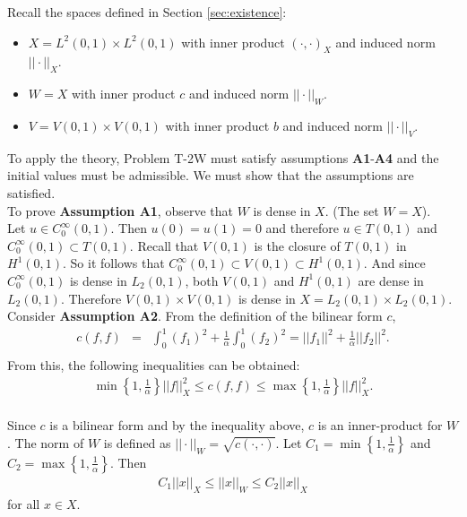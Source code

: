 \documentclass[../../main.tex]{subfiles}
\begin{document}
Recall the spaces defined in Section \ref{sec:existence}:
\begin{itemize}
	\item[] $X = L^2(0,1)\times L^2(0,1)$ with inner product $(\cdot,\cdot)_X$ and induced norm $||\cdot||_X$.
	\item[] $W = X$ with inner product $c$ and induced norm $||\cdot||_W$.
	\item[] $V  = V(0,1)\times V(0,1)$ with inner product $b$ and induced norm $||\cdot||_V$.
\end{itemize}

To apply the theory, Problem T-2W must satisfy assumptions \textbf{A1}-\textbf{A4} and the initial values must be admissible. We must show that the assumptions are satisfied.\\

To prove \textbf{Assumption A1}, observe that $W$ is dense in $X$. (The set $W = X$).\\

Let $u \in C_0^\infty(0,1)$. Then $u(0) = u(1) = 0$ and therefore $u \in T(0,1)$ and $C_0^\infty(0,1) \subset T(0,1)$. Recall that $V(0,1)$ is the closure of $T(0,1)$ in $H^1(0,1)$. So it follows that $C_0^\infty(0,1) \subset V(0,1) \subset H^1(0,1)$. And since $C_0^\infty(0,1)$ is dense in $L_2(0,1)$, both $V(0,1)$ and $H^1(0,1)$ are dense in $L_2(0,1)$. Therefore $V(0,1)\times V(0,1)$ is dense in $X = L_2(0,1) \times L_2(0,1)$.\label{sym:Cinftyzero} \\

Consider \textbf{Assumption A2}. From the definition of the bilinear form $c$,
\begin{eqnarray*}
	c(f,f) & = & \int_0^1  (f_1)^2 + \frac{1}{\alpha}\int_0^1  (f_2)^2 = ||f_1||^2 + \frac{1}{\alpha}||f_2||^2.\\
\end{eqnarray*}
From this, the following inequalities can be obtained:
\begin{eqnarray*}
	\min\left\{1, \frac{1}{\alpha}\right\} ||f||_{X}^2 \leq	c(f,f)	\leq \max\left\{1, \frac{1}{\alpha}\right\} ||f||_{X}^2.\\
\end{eqnarray*}

Since $c$ is a bilinear form and by the inequality above, $c$ is an inner-product for $W$. The norm of $W$ is defined as $||\cdot||_W = \sqrt{c(\cdot,\cdot)}$. Let $C_1 = \min\left\{1, \frac{1}{\alpha}\right\}$ and $C_2 = \max\left\{1, \frac{1}{\alpha}\right\}$. Then
\begin{eqnarray}
	C_1||x||_X \leq ||x||_W \leq C_2||x||_X \label{C}
\end{eqnarray} for all $x \in X$.\\
\end{document}
